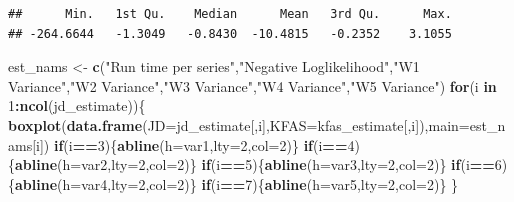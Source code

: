 \documentclass[]{article}
\newenvironment{Shaded}{\begin{snugshade}}{\end{snugshade}}
\newcommand{\KeywordTok}[1]{\textcolor[rgb]{0.13,0.29,0.53}{\textbf{#1}}}
\newcommand{\DataTypeTok}[1]{\textcolor[rgb]{0.13,0.29,0.53}{#1}}
\newcommand{\DecValTok}[1]{\textcolor[rgb]{0.00,0.00,0.81}{#1}}
\newcommand{\StringTok}[1]{\textcolor[rgb]{0.31,0.60,0.02}{#1}}
\newcommand{\ControlFlowTok}[1]{\textcolor[rgb]{0.13,0.29,0.53}{\textbf{#1}}}
\newcommand{\OperatorTok}[1]{\textcolor[rgb]{0.81,0.36,0.00}{\textbf{#1}}}
\newcommand{\NormalTok}[1]{#1}
\begin{document}
\begin{verbatim}
##      Min.   1st Qu.    Median      Mean   3rd Qu.      Max. 
## -264.6644   -1.3049   -0.8430  -10.4815   -0.2352    3.1055
\end{verbatim}

\begin{Shaded}
\begin{Highlighting}[]
\NormalTok{est_nams <-}\StringTok{ }\KeywordTok{c}\NormalTok{(}\StringTok{"Run time per series"}\NormalTok{,}\StringTok{"Negative Loglikelihood"}\NormalTok{,}\StringTok{"W1 Variance"}\NormalTok{,}\StringTok{"W2 Variance"}\NormalTok{,}\StringTok{"W3  Variance"}\NormalTok{,}\StringTok{"W4 Variance"}\NormalTok{,}\StringTok{"W5 Variance"}\NormalTok{)}
\ControlFlowTok{for}\NormalTok{(i }\ControlFlowTok{in} \DecValTok{1}\OperatorTok{:}\KeywordTok{ncol}\NormalTok{(jd_estimate))\{}
  \KeywordTok{boxplot}\NormalTok{(}\KeywordTok{data.frame}\NormalTok{(}\DataTypeTok{JD=}\NormalTok{jd_estimate[,i],}\DataTypeTok{KFAS=}\NormalTok{kfas_estimate[,i]),}\DataTypeTok{main=}\NormalTok{est_nams[i])}
  \ControlFlowTok{if}\NormalTok{(i}\OperatorTok{==}\DecValTok{3}\NormalTok{)\{}\KeywordTok{abline}\NormalTok{(}\DataTypeTok{h=}\NormalTok{var1,}\DataTypeTok{lty=}\DecValTok{2}\NormalTok{,}\DataTypeTok{col=}\DecValTok{2}\NormalTok{)\}}
  \ControlFlowTok{if}\NormalTok{(i}\OperatorTok{==}\DecValTok{4}\NormalTok{)\{}\KeywordTok{abline}\NormalTok{(}\DataTypeTok{h=}\NormalTok{var2,}\DataTypeTok{lty=}\DecValTok{2}\NormalTok{,}\DataTypeTok{col=}\DecValTok{2}\NormalTok{)\}}
  \ControlFlowTok{if}\NormalTok{(i}\OperatorTok{==}\DecValTok{5}\NormalTok{)\{}\KeywordTok{abline}\NormalTok{(}\DataTypeTok{h=}\NormalTok{var3,}\DataTypeTok{lty=}\DecValTok{2}\NormalTok{,}\DataTypeTok{col=}\DecValTok{2}\NormalTok{)\}}
  \ControlFlowTok{if}\NormalTok{(i}\OperatorTok{==}\DecValTok{6}\NormalTok{)\{}\KeywordTok{abline}\NormalTok{(}\DataTypeTok{h=}\NormalTok{var4,}\DataTypeTok{lty=}\DecValTok{2}\NormalTok{,}\DataTypeTok{col=}\DecValTok{2}\NormalTok{)\}}
  \ControlFlowTok{if}\NormalTok{(i}\OperatorTok{==}\DecValTok{7}\NormalTok{)\{}\KeywordTok{abline}\NormalTok{(}\DataTypeTok{h=}\NormalTok{var5,}\DataTypeTok{lty=}\DecValTok{2}\NormalTok{,}\DataTypeTok{col=}\DecValTok{2}\NormalTok{)\}}
\NormalTok{\}}
\end{Highlighting}
\end{Shaded}
\end{document}

